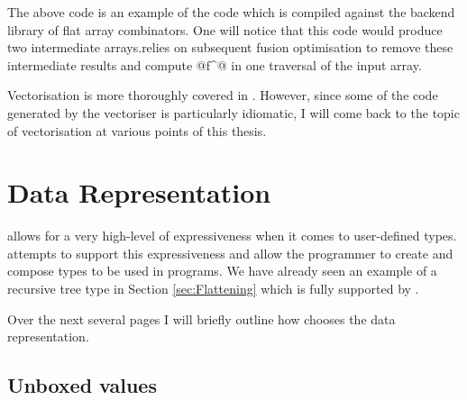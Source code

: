 \documentclass[preamble.tex]{subfiles}
\begin{document}
The above code is an example of the code which is compiled against the backend library of flat array combinators. One will notice that this code would produce two intermediate arrays.\iintermediate \DPH relies on subsequent fusion optimisation to remove these intermediate results and compute @f^@ in one traversal of the input array.




Vectorisation is more thoroughly covered in \cite{PLKC08}. However, since some of the code generated by the vectoriser is particularly idiomatic, I will come back to the topic of vectorisation at various points of this thesis.



\clearpage

\section{Data Representation}
\label{sec:DPH-Data-Representation}

\Haskell allows for a very high-level of expressiveness when it comes to user-defined types. \DPH attempts to support this expressiveness and allow the programmer to create and compose types to be used in \DPH programs. We have already seen an example of a recursive tree type in Section \ref{sec:Flattening} which is fully supported by \DPH.

Over the next several pages I will briefly outline how \DPH chooses the data representation.


\subsection{Unboxed values}
\iboxing
\end{document}
